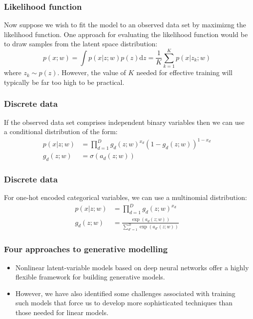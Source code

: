 \documentclass{beamer}
\begin{document}
\begin{frame}
    \frametitle{Likelihood function}
    Now suppose we wish to fit the model to an observed data set by maximizng the likelihood function. One approach for evaluating the likelihood function would be to draw samples from the latent space distribution:
    \begin{equation*}
        p(x;w)=\int{}p(x|z;w)p(z)\mathrm{d}z=\frac{1}{K}\sum_{k=1}^{K}p(x|z_{k};w)
    \end{equation*}
    where $z_{k}\sim{}p(z)$. However, the value of $K$ needed for effective training will typically be far too high to be practical.
\end{frame}

\begin{frame}
    \frametitle{Discrete data}
    If the observed data set comprises independent binary variables then we can use a conditional distribution of the form:
    \begin{align*}
        p(x|z;w)&=\prod_{d=1}^{D}g_{d}(z;w)^{x_{d}}(1-g_{d}(z;w))^{1-x_{d}} \\
        g_{d}(z;w)&=\sigma(a_{d}(z;w))
    \end{align*}
\end{frame}

\begin{frame}
    \frametitle{Discrete data}
    For one-hot encoded categorical variables, we can use a multinomial distribution:
    \begin{align*}
        p(x|z;w)&=\prod_{d=1}^{D}g_{d}(z;w)^{x_d} \\
        g_{d}(z;w)&=\frac{\exp(a_{d}(z;w))}{\sum_{d'=1}^{D}\exp(a_{d'}(z;w))}
    \end{align*}
\end{frame}

\begin{frame}
    \frametitle{Four approaches to generative modelling}
    \begin{itemize}
        \item Nonlinear latent-variable models based on deep neural networks offer a highly flexible framework for building generative models.
        \item However, we have also identified some challenges associated with training such models that force us to develop more sophisticated techniques than those needed for linear models.
    \end{itemize}
\end{frame}
\end{document}
